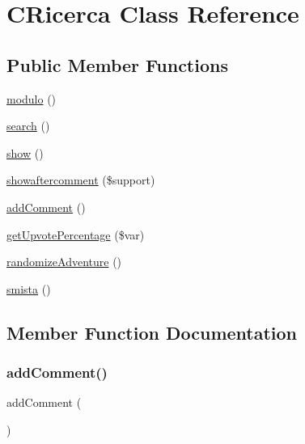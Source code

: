 \hypertarget{class_c_ricerca}{}\section{C\+Ricerca Class Reference}
\label{class_c_ricerca}
\subsection*{Public Member Functions}
\begin{DoxyCompactItemize}
\item 
\mbox{\hyperlink{class_c_ricerca_ae049a865cd77c4182dd44281b313b545}{modulo}} ()
\item 
\mbox{\hyperlink{class_c_ricerca_a796bf438724e047aeef18579732a3780}{search}} ()
\item 
\mbox{\hyperlink{class_c_ricerca_a2b8e3779f5bd8c38f70307574859bd36}{show}} ()
\item 
\mbox{\hyperlink{class_c_ricerca_aa9482546e95fc12ed93c1f37b2173007}{showaftercomment}} (\$support)
\item 
\mbox{\hyperlink{class_c_ricerca_a564645b21e8986c7a4271a721216fcb4}{add\+Comment}} ()
\item 
\mbox{\hyperlink{class_c_ricerca_a10b8a67c58f8c91b47c1ece8959754be}{get\+Upvote\+Percentage}} (\$var)
\item 
\mbox{\hyperlink{class_c_ricerca_a1882c9da84dc67772d89caa949280531}{randomize\+Adventure}} ()
\item 
\mbox{\hyperlink{class_c_ricerca_afc7ba180569cef3535974cfc4a1211f1}{smista}} ()
\end{DoxyCompactItemize}


\subsection{Member Function Documentation}
\mbox{\label{class_c_ricerca_a564645b21e8986c7a4271a721216fcb4}} 
\subsubsection{\texorpdfstring{add\+Comment()}{addComment()}}
{\footnotesize\ttfamily add\+Comment (\begin{DoxyParamCaption}{ }\end{DoxyParamCaption})}

